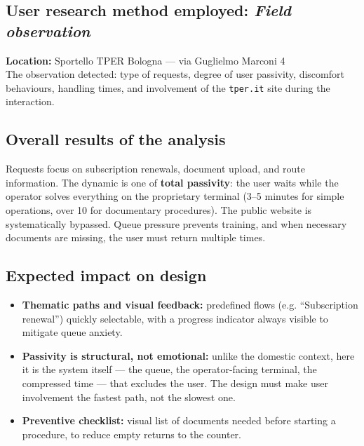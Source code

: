 ﻿\documentclass[11pt,a4paper]{article}
\begin{document}
\subsection*{User research method employed: \textit{Field observation}}
\begin{tcolorbox}[base]
\textbf{Location:} Sportello TPER Bologna --- via Guglielmo Marconi 4
\\[0.3cm]
The observation detected: type of requests, degree of user passivity,
discomfort behaviours, handling times, and
involvement of the \texttt{tper.it} site during the interaction.
\end{tcolorbox}

\subsection*{Overall results of the analysis}
\begin{tcolorbox}[base]
Requests focus on subscription renewals, document upload,
and route information. The dynamic is one of \textbf{total passivity}:
the user waits while the operator solves everything on the proprietary terminal
(3--5 minutes for simple operations, over 10 for documentary procedures).
The public website is systematically bypassed. Queue
pressure prevents training, and when necessary documents are missing,
the user must return multiple times.
\end{tcolorbox}

\subsection*{Expected impact on design}
\begin{tcolorbox}[base]

\begin{itemize}[leftmargin=*,itemsep=6pt]

    \item \textbf{Thematic paths and visual feedback:}
    predefined flows (e.g. ``Subscription renewal'') quickly
    selectable, with a progress indicator always visible to
    mitigate queue anxiety.

    \item \textbf{Passivity is structural, not emotional:}
    unlike the domestic context, here it is the system itself ---
    the queue, the operator-facing terminal, the compressed time ---
    that excludes the user. The design must make user involvement
    the fastest path, not the slowest one.

    \item \textbf{Preventive checklist:} visual list of documents
    needed before starting a procedure, to reduce empty
    returns to the counter.

\end{itemize}
\end{tcolorbox}
\end{document}
